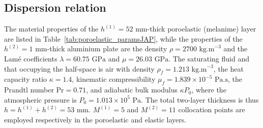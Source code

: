     \subsection{Dispersion relation}\label{Disrel}
The material properties of the $h^{(1)}= 52\textrm{ mm}$-thick poroelastic (melanime) layer are listed in Table~\ref{tab:poroelastic_paramsJAP}, while the properties of the $h^{(2)}=1\textrm{ mm}$-thick aluminium plate are the density $\rho = 2700 \textrm{ kg.m}^{-3}$ and the Lamé coefficients $\lambda = 60.75 \textrm{ GPa}$ and $\mu =  26.03 \textrm{ GPa}$. The saturating fluid and that occupying the half-space is air with density $\rho_f = 1.213\textrm{ kg.m}^{-3}$, the heat capacity ratio $\kappa = 1.4$, kinematic compressibility $\mu_f = 1.839 \times 10^{-5} \textrm{ Pa.s}$, the Prandtl number $\textrm{Pr} = 0.71$, and adiabatic bulk modulus $\kappa P_0$, where the atmospheric pressure is $P_0 = 1.013 \times 10^5 \textrm{ Pa}$. The total two-layer thickness is thus $h=h^{(1)}+h^{(2)}=53\textrm{ mm}$. $M^{(1)}=5$ and $M^{(2)}=11$ collocation points are employed respectively in the poroelastic and elastic layers.
    
